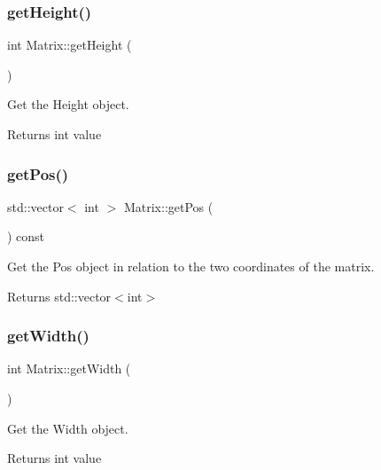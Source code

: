 \subsubsection{\texorpdfstring{get\+Height()}{getHeight()}}
{\footnotesize\ttfamily int Matrix\+::get\+Height (\begin{DoxyParamCaption}{ }\end{DoxyParamCaption})}



Get the Height object. 

\begin{DoxyReturn}{Returns}
int value 
\end{DoxyReturn}
\mbox{\label{classMatrix_a9fa09bc31e6e2dfe4ced74eb34de0f70}} 
\subsubsection{\texorpdfstring{get\+Pos()}{getPos()}}
{\footnotesize\ttfamily std\+::vector$<$ int $>$ Matrix\+::get\+Pos (\begin{DoxyParamCaption}{ }\end{DoxyParamCaption}) const}



Get the Pos object in relation to the two coordinates of the matrix. 

\begin{DoxyReturn}{Returns}
std\+::vector$<$int$>$ 
\end{DoxyReturn}
\mbox{\label{classMatrix_a3f51ba6280305f2d692ab754800297fa}} 
\subsubsection{\texorpdfstring{get\+Width()}{getWidth()}}
{\footnotesize\ttfamily int Matrix\+::get\+Width (\begin{DoxyParamCaption}{ }\end{DoxyParamCaption})}



Get the Width object. 

\begin{DoxyReturn}{Returns}
int value 
\end{DoxyReturn}
\mbox{\label{classMatrix_a993ef93c4c0b32047586dd3e3a981853}} 
